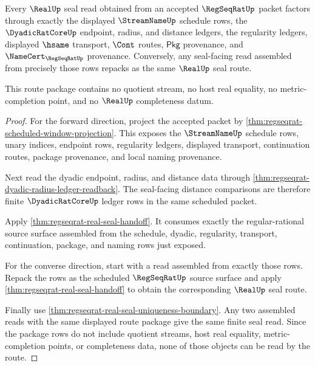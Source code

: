 \begin{theorem}\label{thm:regseqrat-real-seal-route-exclusion-package}
Every $\RealUp$ seal read obtained from an accepted $\RegSeqRatUp$ packet
factors through exactly the displayed $\StreamNameUp$ schedule rows, the
$\DyadicRatCoreUp$ endpoint, radius, and distance ledgers, the regularity
ledgers, displayed $\hsame$ transport, $\Cont$ routes, $\mathsf{Pkg}$
provenance, and $\NameCert_{\RegSeqRatUp}$ provenance. Conversely, any
seal-facing read assembled from precisely those rows repacks as the same
$\RealUp$ seal route.

This route package contains no quotient stream, no host real equality, no
metric-completion point, and no $\RealUp$ completeness datum.
\end{theorem}
\begin{proof}
For the forward direction, project the accepted packet by
\autoref{thm:regseqrat-scheduled-window-projection}. This exposes the
$\StreamNameUp$ schedule rows, unary indices, endpoint rows, regularity
ledgers, displayed transport, continuation routes, package provenance, and
local naming provenance.

Next read the dyadic endpoint, radius, and distance data through
\autoref{thm:regseqrat-dyadic-radius-ledger-readback}. The seal-facing
distance comparisons are therefore finite $\DyadicRatCoreUp$ ledger rows in
the same scheduled packet.

Apply \autoref{thm:regseqrat-real-seal-handoff}. It consumes exactly the
regular-rational source surface assembled from the schedule, dyadic, regularity,
transport, continuation, package, and naming rows just exposed.

For the converse direction, start with a read assembled from exactly those
rows. Repack the rows as the scheduled $\RegSeqRatUp$ source surface and apply
\autoref{thm:regseqrat-real-seal-handoff} to obtain the corresponding
$\RealUp$ seal route.

Finally use \autoref{thm:regseqrat-real-seal-uniqueness-boundary}. Any two
assembled reads with the same displayed route package give the same finite seal
read. Since the package rows do not include quotient streams, host real
equality, metric-completion points, or completeness data, none of those objects
can be read by the route.
\end{proof}

